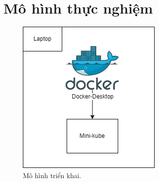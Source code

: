 \documentclass[12pt,a4paper]{report}
\begin{document}
	\section{Mô hình thực nghiệm}
	\begin{figure}[h]
	\centering
	\includegraphics[width=0.7\linewidth]{Pics/diagram}
	\caption{\label{fig:diagram} Mô hình triển khai.}
	\label{fig:diagram}
	\end{figure}
\end{document}
